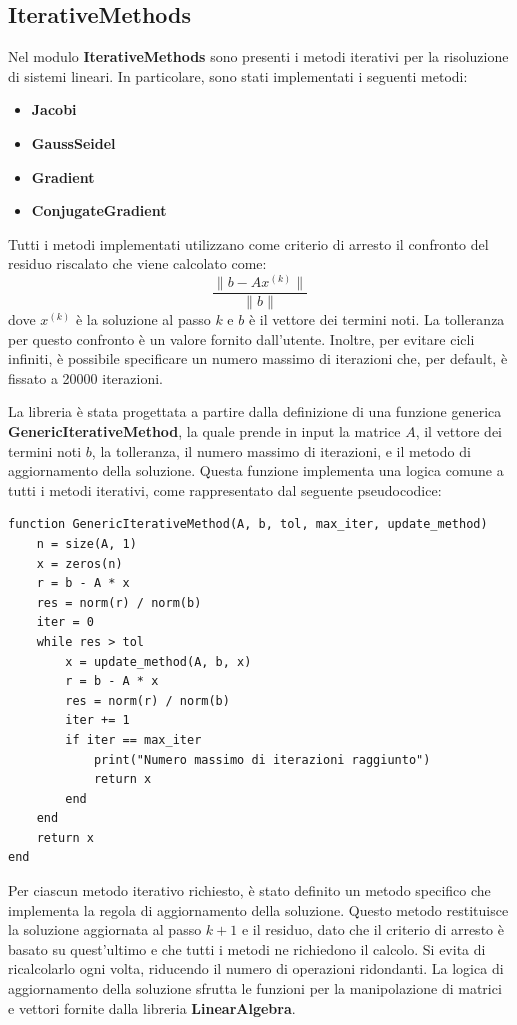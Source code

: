 \subsection{IterativeMethods}
Nel modulo \textbf{IterativeMethods} sono presenti i metodi iterativi per la
risoluzione di sistemi lineari. In particolare, sono stati implementati i seguenti
metodi:
\begin{itemize}
    \item \textbf{Jacobi}
    \item \textbf{GaussSeidel}
    \item \textbf{Gradient}
    \item \textbf{ConjugateGradient}
\end{itemize}

Tutti i metodi implementati utilizzano come criterio di arresto il confronto del
residuo riscalato che viene calcolato come:
\begin{equation}
    \frac{\|b - Ax^{(k)}\|}{\|b\|}
\end{equation}
dove $x^{(k)}$ è la soluzione al passo $k$ e $b$ è il vettore dei termini noti.
La tolleranza per questo confronto è un valore fornito dall'utente.
Inoltre, per evitare cicli infiniti, è possibile specificare un numero massimo
di iterazioni che, per default, è fissato a 20000 iterazioni.

La libreria è stata progettata a partire dalla definizione di una funzione generica
\textbf{GenericIterativeMethod}, la quale prende in input la matrice $A$, il
vettore dei termini noti $b$, la tolleranza, il numero massimo di iterazioni, e
il metodo di aggiornamento della soluzione. Questa funzione implementa una logica
comune a tutti i metodi iterativi, come rappresentato dal seguente pseudocodice:
\begin{verbatim}
function GenericIterativeMethod(A, b, tol, max_iter, update_method)
    n = size(A, 1)
    x = zeros(n)
    r = b - A * x
    res = norm(r) / norm(b)
    iter = 0
    while res > tol
        x = update_method(A, b, x)
        r = b - A * x
        res = norm(r) / norm(b)
        iter += 1
        if iter == max_iter
            print("Numero massimo di iterazioni raggiunto")
            return x
        end
    end
    return x
end
\end{verbatim}

Per ciascun metodo iterativo richiesto, è stato definito un metodo specifico che
implementa la regola di aggiornamento della soluzione. Questo metodo restituisce
la soluzione aggiornata al passo $k+1$ e il residuo, dato che il criterio di 
arresto è basato su quest'ultimo e che tutti i metodi ne richiedono il calcolo. 
Si evita di ricalcolarlo ogni volta, riducendo il numero di operazioni ridondanti.
La logica di aggiornamento della soluzione sfrutta le funzioni per la manipolazione 
di matrici e vettori fornite dalla libreria \textbf{LinearAlgebra}.

